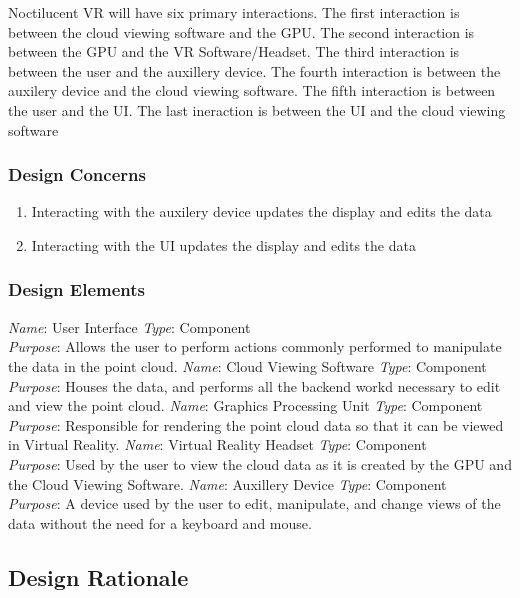 \documentclass{article}
\begin{document}
Noctilucent VR will have six primary interactions.
The first interaction is between the cloud viewing software and the GPU.
The second interaction is between the GPU and the VR Software/Headset.
The third interaction is between the user and the auxillery device.
The fourth interaction is between the auxilery device and the cloud viewing software.
The fifth interaction is between the user and the UI.
The last ineraction is between the UI and the cloud viewing software

\subsubsection{Design Concerns}

\begin{enumerate}
	\item Interacting with the auxilery device updates the display and edits the data
	\item Interacting with the UI updates the display and edits the data
\end{enumerate}

\subsubsection{Design Elements}

		\textit{Name}: User Interface
		\textit{Type}: Component\\
		\textit{Purpose}: Allows the user to perform actions commonly performed to manipulate the data in the point cloud.
\newline
		\textit{Name}: Cloud Viewing Software
		\textit{Type}: Component\\
		\textit{Purpose}: Houses the data, and performs all the backend workd necessary to edit and view the point cloud.
\newline
		\textit{Name}: Graphics Processing Unit
		\textit{Type}: Component\\
		\textit{Purpose}: Responsible for rendering the point cloud data so that it can be viewed in Virtual Reality.
\newline
		\textit{Name}: Virtual Reality Headset
		\textit{Type}: Component\\
		\textit{Purpose}: Used by the user to view the cloud data as it is created by the GPU and the Cloud Viewing Software.
\newline
		\textit{Name}: Auxillery Device
		\textit{Type}: Component\\
		\textit{Purpose}: A device used by the user to edit, manipulate, and change views of the data without the need for a keyboard and mouse.

\subsection{Design Rationale}
\end{document}

